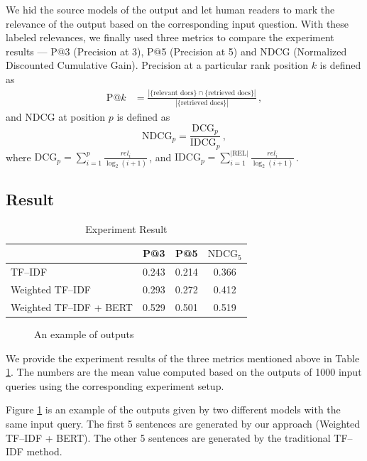 We hid the source models of the output and let human readers to mark the relevance of the output based on the corresponding input question. With these labeled relevances, we finally used three metrics to compare the experiment results --- P@3 (Precision at 3), P@5 (Precision at 5) and NDCG (Normalized Discounted Cumulative Gain). Precision at a particular rank position $k$ is defined as
\begin{align*}
    \mbox{P@$k$} &= \frac{|\{\mbox{relevant docs}\}\cap\{\mbox{retrieved docs}\}|}{|\{\mbox{retrieved docs}\}|}  \,,
\end{align*}
and NDCG at position $p$ is defined as
\begin{displaymath}
  \text{NDCG}_p = \frac{\text{DCG}_p}{\text{IDCG}_p} \,,
\end{displaymath}
where $\text{DCG}_p=\sum_{i=1}^{p}\frac{rel_i}{\log_2(i+1)}$\,, and $\text{IDCG}_p=\sum_{i=1}^{\text{|REL|}}\frac{rel_i}{\log_2(i+1)}$\,.

\subsection{Result}

\begin{table}[h]
  \caption{Experiment Result}
  \label{tab:experiment-result}
  \begin{tabular}{lccc}
    \toprule
    \, & P@3 & P@5 & $\text{NDCG}_5$ \\
    \midrule
    TF--IDF & 0.243 & 0.214 & 0.366 \\
    Weighted TF--IDF & 0.293 & 0.272 & 0.412 \\
    Weighted TF--IDF + BERT & 0.529 & 0.501 & 0.519 \\
  \bottomrule
\end{tabular}
\end{table}

\begin{figure}[t]

\caption{An example of outputs}\label{fig:example}
\end{figure}

We provide the experiment results of the three metrics mentioned above in Table \ref{tab:experiment-result}. The numbers are the mean value computed based on the outputs of 1000 input queries using the corresponding experiment setup.

Figure \ref{fig:example} is an example of the outputs given by two different models with the same input query. The first 5 sentences are generated by our approach (Weighted TF--IDF + BERT). The other 5 sentences are generated by the traditional TF--IDF method.


